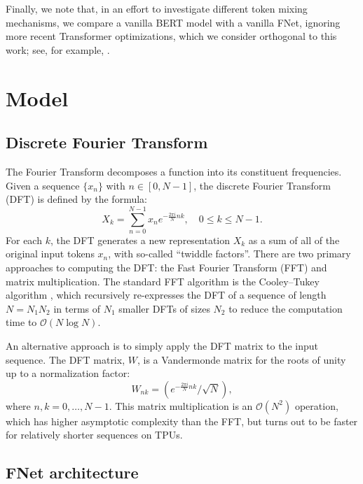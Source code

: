 \documentclass[11pt]{article}
\renewcommand{\O}[1]{$\mathcal{O}(#1)$}
\begin{document}
Finally, we note that, in an effort to investigate different token mixing mechanisms, we compare a vanilla BERT model \citep{devlin2018bert} with a vanilla FNet, ignoring more recent Transformer optimizations, which we consider orthogonal to this work; see, for example, \citep{narang2021transformer, kim2020fastformers, shleifer2020pre}.
 \section{Model}
\label{sec:model}

\subsection{Discrete Fourier Transform}
\label{subsec:dft_background}

The Fourier Transform decomposes a function into its constituent frequencies. Given a sequence $\{x_n\}$ with $n \in [0, N-1]$, the discrete Fourier Transform (DFT) is defined by the formula:
\begin{equation}
    \label{eq:dft}
    X_k = \sum_{n=0}^{N-1} x_n e^{-{\frac{2\pi i}{N}} n k}, \quad 0 \leq k \leq N-1.
\end{equation}
For each $k$, the DFT generates a new representation $X_k$ as a sum of all of the original input tokens $x_n$, with so-called ``twiddle factors''.
There are two primary approaches to computing the DFT: the Fast Fourier Transform (FFT) and matrix multiplication. The standard FFT algorithm is the Cooley–Tukey algorithm \citep{cooley1965algorithm, frigo2005design}, which recursively re-expresses the DFT of a sequence of length $N = N_1N_2$ in terms of $N_1$ smaller DFTs of sizes $N_2$ to reduce the computation time to \O{N \log N}. 

An alternative approach is to simply apply the DFT matrix to the input sequence. The DFT matrix, $W$, is a Vandermonde matrix for the roots of unity up to a normalization factor:
\begin{equation}
    \label{eq:vandermonde}
    W_{nk} = \left({e^{-{\frac{2\pi i}{N}} n k}}/{\sqrt{N}}\right),
\end{equation}
where  $n,k = 0, \ldots , N-1$.
This matrix multiplication is an \O{N^2} operation, which has higher asymptotic complexity than the FFT, but turns out to be faster for relatively shorter sequences on TPUs.


\subsection{FNet architecture}
\label{subsec:architecture}
\end{document}
